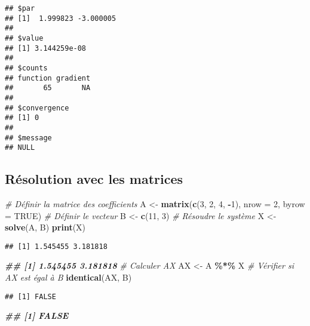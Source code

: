 \documentclass[
]{article}
\newenvironment{Shaded}{\begin{snugshade}}{\end{snugshade}}
\newcommand{\AttributeTok}[1]{\textcolor[rgb]{0.13,0.29,0.53}{#1}}
\newcommand{\CommentTok}[1]{\textcolor[rgb]{0.56,0.35,0.01}{\textit{#1}}}
\newcommand{\ConstantTok}[1]{\textcolor[rgb]{0.56,0.35,0.01}{#1}}
\newcommand{\DecValTok}[1]{\textcolor[rgb]{0.00,0.00,0.81}{#1}}
\newcommand{\DocumentationTok}[1]{\textcolor[rgb]{0.56,0.35,0.01}{\textbf{\textit{#1}}}}
\newcommand{\FunctionTok}[1]{\textcolor[rgb]{0.13,0.29,0.53}{\textbf{#1}}}
\newcommand{\NormalTok}[1]{#1}
\newcommand{\OtherTok}[1]{\textcolor[rgb]{0.56,0.35,0.01}{#1}}
\newcommand{\SpecialCharTok}[1]{\textcolor[rgb]{0.81,0.36,0.00}{\textbf{#1}}}
\begin{document}
\begin{verbatim}
## $par
## [1]  1.999823 -3.000005
## 
## $value
## [1] 3.144259e-08
## 
## $counts
## function gradient 
##       65       NA 
## 
## $convergence
## [1] 0
## 
## $message
## NULL
\end{verbatim}

\hypertarget{ruxe9solution-avec-les-matrices}{%
\subsection{Résolution avec les
matrices}\label{ruxe9solution-avec-les-matrices}}

\begin{Shaded}
\begin{Highlighting}[]
\CommentTok{\# Définir la matrice des coefficients}
\NormalTok{A }\OtherTok{\textless{}{-}} \FunctionTok{matrix}\NormalTok{(}\FunctionTok{c}\NormalTok{(}\DecValTok{3}\NormalTok{, }\DecValTok{2}\NormalTok{, }\DecValTok{4}\NormalTok{, }\SpecialCharTok{{-}}\DecValTok{1}\NormalTok{), }\AttributeTok{nrow =} \DecValTok{2}\NormalTok{, }\AttributeTok{byrow =} \ConstantTok{TRUE}\NormalTok{)}
\CommentTok{\# Définir le vecteur}
\NormalTok{B }\OtherTok{\textless{}{-}} \FunctionTok{c}\NormalTok{(}\DecValTok{11}\NormalTok{, }\DecValTok{3}\NormalTok{)}
\CommentTok{\# Résoudre le système}
\NormalTok{X }\OtherTok{\textless{}{-}} \FunctionTok{solve}\NormalTok{(A, B)}
\FunctionTok{print}\NormalTok{(X)}
\end{Highlighting}
\end{Shaded}

\begin{verbatim}
## [1] 1.545455 3.181818
\end{verbatim}

\begin{Shaded}
\begin{Highlighting}[]
\DocumentationTok{\#\# [1] 1.545455 3.181818}
\CommentTok{\# Calculer AX}
\NormalTok{AX }\OtherTok{\textless{}{-}}\NormalTok{ A }\SpecialCharTok{\%*\%}\NormalTok{ X}
\CommentTok{\# Vérifier si AX est égal à B}
\FunctionTok{identical}\NormalTok{(AX, B)}
\end{Highlighting}
\end{Shaded}

\begin{verbatim}
## [1] FALSE
\end{verbatim}

\begin{Shaded}
\begin{Highlighting}[]
\DocumentationTok{\#\# [1] FALSE}
\end{Highlighting}
\end{Shaded}
\end{document}
